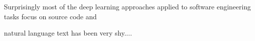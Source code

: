 Surprisingly 
most of the deep learning approaches applied to software engineering tasks 
focus on source code and 

natural language text has been very shy....





















